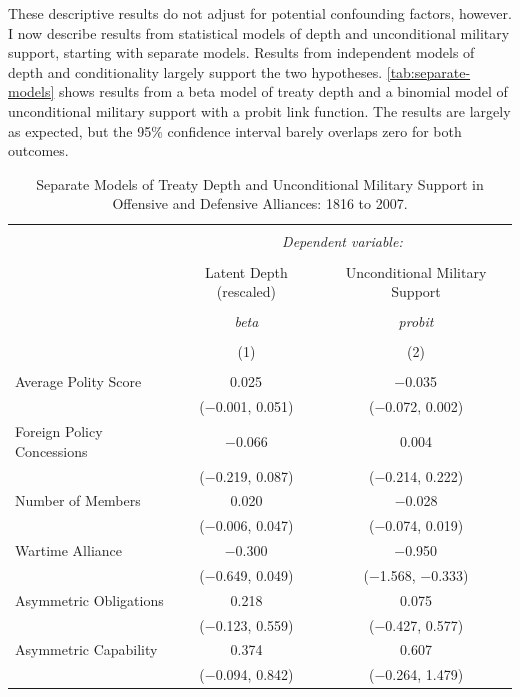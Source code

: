 \documentclass[12pt]{article}
\begin{document}
These descriptive results do not adjust for potential confounding factors, however.
I now describe results from statistical models of depth and unconditional military support, starting with separate models. 
Results from independent models of depth and conditionality largely support the two hypotheses. 
\autoref{tab:separate-models} shows results from a beta model of treaty depth and a binomial model of unconditional military support with a probit link function. 
The results are largely as expected, but the 95\% confidence interval barely overlaps zero for both outcomes.  


\begin{table}[!htbp] \centering 
  \caption{Separate Models of Treaty Depth and Unconditional Military Support in Offensive and Defensive Alliances: 1816 to 2007.} 
  \label{tab:separate-models} 
\begin{tabular}{@{\extracolsep{5pt}}lcc} 
\\[-1.8ex]\hline 
\hline \\[-1.8ex] 
 & \multicolumn{2}{c}{\textit{Dependent variable:}} \\ 
\cline{2-3} 
\\[-1.8ex] & Latent Depth (rescaled) & Unconditional Military Support \\ 
\\[-1.8ex] & \textit{beta} & \textit{probit} \\ 
\\[-1.8ex] & (1) & (2)\\ 
\hline \\[-1.8ex] 
 Average Polity Score & 0.025$^{}$ & $-$0.035$^{}$ \\ 
  & ($-$0.001, 0.051) & ($-$0.072, 0.002) \\ 
  Foreign Policy Concessions & $-$0.066 & 0.004 \\ 
  & ($-$0.219, 0.087) & ($-$0.214, 0.222) \\ 
  Number of Members & 0.020 & $-$0.028 \\ 
  & ($-$0.006, 0.047) & ($-$0.074, 0.019) \\ 
  Wartime Alliance & $-$0.300$^{}$ & $-$0.950$^{}$ \\ 
  & ($-$0.649, 0.049) & ($-$1.568, $-$0.333) \\ 
  Asymmetric Obligations & 0.218 & 0.075 \\ 
  & ($-$0.123, 0.559) & ($-$0.427, 0.577) \\ 
  Asymmetric Capability & 0.374 & 0.607 \\ 
  & ($-$0.094, 0.842) & ($-$0.264, 1.479) \\ 

\end{tabular}
\end{table}
\end{document}
